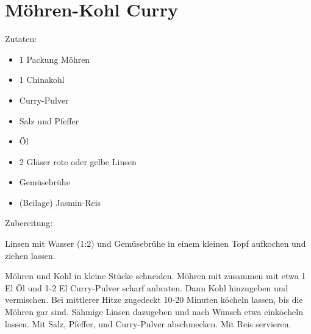 \section{Möhren-Kohl Curry}
Zutaten:
\begin{itemize}
    \item 1 Packung Möhren
    \item 1 Chinakohl
    \item Curry-Pulver
    \item Salz und Pfeffer
    \item Öl
    \item 2 Gläser rote oder gelbe Linsen
    \item Gemüsebrühe
    \item (Beilage) Jasmin-Reis
\end{itemize}

\noindent Zubereitung:

\noindent Linsen mit Wasser (1:2) und Gemüsebrühe in einem kleinen Topf
aufkochen und ziehen lassen.

Möhren und Kohl in kleine Stücke schneiden. Möhren mit zusammen mit etwa 1 El
Öl und 1-2 El Curry-Pulver scharf anbraten. Dann Kohl hinzugeben und
vermischen. Bei mittlerer Hitze zugedeckt 10-20 Minuten köcheln lassen, bis die
Möhren gar sind. Sähmige Linsen dazugeben und nach Wunsch etwa einköcheln
lassen. Mit Salz, Pfeffer, und Curry-Pulver abschmecken. Mit Reis servieren.

\newpage
\mbox{}
\vfill
\begin{center}
\end{center}
\vfill
\mbox{ }
\newpage
